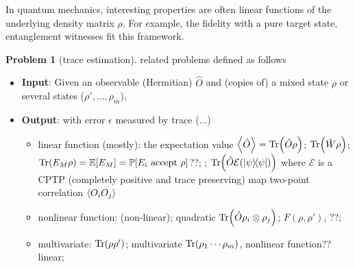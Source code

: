 \documentclass[
10pt,
aps,
pra,
linenumbers,
floatfix,
]{revtex4-2}
\theoremstyle{plain}
\theoremstyle{definition}
\newtheorem{problem}{Problem}
\newcommand{\ew}{\hat{W}}
\newcommand{\ob}{\hat{O}}
\newcommand{\dm}{\rho}
\begin{document}
In quantum mechanics, interesting properties are often linear functions of the underlying density matrix $\dm$.
For example, the fidelity with a pure target state, entanglement witnesses fit this framework.
\begin{problem}[trace estimation]\label{prm:trace_estimation}
	related problems defined as follows
	\begin{itemize}
		\item \textbf{Input}: Given an observable (Hermitian) $\ob$ and (copies of) a mixed state $\dm$ or several states ($\dm',\dots,\dm_m$), 
		\item \textbf{Output}: with error $\epsilon$ measured by trace  (...)
		\begin{itemize}
			\item linear function (mostly):
			the expectation value $\expval{\ob}=\Tr(\ob \dm) $; 
			 $\Tr(\ew\dm)$;
			 $\Tr(E_M\dm) = \expectation[E_M] = \probability[E_i \text{ accept } \dm]$??;
			;
			$\Tr(\ob\mathcal{E}(\op{\psi}))$ where $\mathcal{E}$ is a CPTP (completely positive and trace preserving) map
			two-point correlation $\expval{O_iO_j}$

			\item nonlinear function:
			 (non-linear); quadratic $\Tr(\ob \dm_i \otimes \dm_j)$;
			 $F(\dm,\dm')$, ??;

			\item multivariate: 
			 $\Tr(\dm\dm')$;
			multivariate $\Tr(\dm_1 \cdots \dm_m)$, nonlinear function?? linear;
		\end{itemize}
	\end{itemize}
\end{problem}
\end{document}

